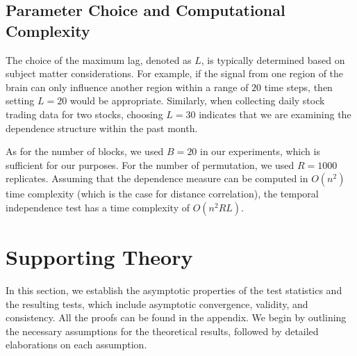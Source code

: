 \subsection{Parameter Choice and Computational Complexity}

The choice of the maximum lag, denoted as $L$, is typically determined based on subject matter considerations. For example, if the signal from one region of the brain can only influence another region within a range of $20$ time steps, then setting $L = 20$ would be appropriate. Similarly, when collecting daily stock trading data for two stocks, choosing $L = 30$ indicates that we are examining the dependence structure within the past month. 

As for the number of blocks, we used $B = 20$ in our experiments, which is sufficient for our purposes. For the number of permutation, we used $R = 1000$ replicates. Assuming that the dependence measure can be computed in $O(n^2)$ time complexity (which is the case for distance correlation), the temporal independence test has a time complexity of $O(n^2 RL)$.

\section{Supporting Theory}
\label{sec:theory}

In this section, we establish the asymptotic properties of the test statistics and the resulting tests, which include asymptotic convergence, validity, and consistency. All the proofs can be found in the appendix. We begin by outlining the necessary assumptions for the theoretical results, followed by detailed elaborations on each assumption.

